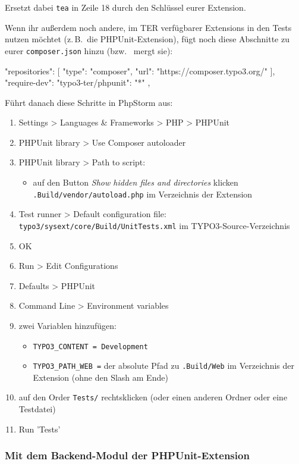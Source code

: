\documentclass[a4paper,11pt,headsepline]{scrartcl}
\begin{document}
Ersetzt dabei \texttt{tea} in Zeile 18 durch den Schlüssel eurer Extension.

Wenn ihr außerdem noch andere, im TER verfügbarer Extensions in den Tests nutzen möchtet (z.\,B.~die PHPUnit-Extension), fügt noch diese Abschnitte zu eurer \texttt{composer.json} hinzu (bzw.~ mergt sie):

\begin{jsoncode}
"repositories": [
{
  "type": "composer",
  "url": "https://composer.typo3.org/"
}
],
"require-dev": {
  "typo3-ter/phpunit": "*"
},
\end{jsoncode}

Führt danach diese Schritte in PhpStorm aus:
\begin{enumerate}
  \item Settings > Languages \& Frameworks > PHP > PHPUnit
  \item PHPUnit library > Use Composer autoloader
  \item PHPUnit library > Path to script:
    \begin{itemize}
      \item auf den Button \emph{Show hidden files and directories} klicken
      \texttt{.Build/vendor/autoload.php} im Verzeichnis der Extension
    \end{itemize}
  \item Test runner > Default configuration file: \texttt{typo3/sysext/core/Build/UnitTests.xml} im TYPO3-Source-Verzeichnis
  \item OK
  \item Run > Edit Configurations
  \item Defaults > PHPUnit
  \item Command Line > Environment variables
  \item zwei Variablen hinzufügen:
    \begin{itemize}
      \item \texttt{TYPO3\_CONTENT = Development}
      \item \texttt{TYPO3\_PATH\_WEB =} der absolute Pfad zu \texttt{.Build/Web} im Verzeichnis der Extension (ohne den Slash am Ende)
    \end{itemize}
  \item auf den Order \texttt{Tests/} rechtsklicken (oder einen anderen Ordner oder eine Testdatei)
  \item Run 'Tests'
\end{enumerate}



\subsubsection{Mit dem Backend-Modul der PHPUnit-Extension}
\end{document}
